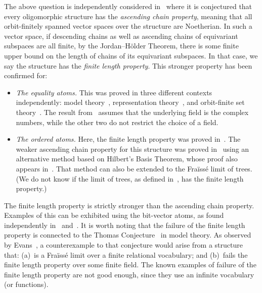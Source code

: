 The above question is independently considered in~\cite[p.~21]{BFKM24} where it is conjectured that every oligomorphic structure has the \emph{ascending chain property}, meaning that all orbit-finitely spanned vector spaces over the structure are Noetherian.
In such a vector space, if descending chains as well as ascending chains of equivariant subspaces are all finite, by the Jordan--Hölder Theorem, there is some finite upper bound on the length of chains of its equivariant subspaces.
In that case, we say the structure has the \emph{finite length property}.
This stronger property has been confirmed for:
\begin{itemize}
    \item \emph{The equality atoms.} 
    This was proved in three different contexts independently: model theory~\cite[Thm.~3.9]{EvansRashwan_02}, representation theory~\cite[Prop.~6.1.6]{SamSnowden_15}, and orbit-finite set theory~\cite[Cor.~4.9]{BFKM24}. 
    The result from~\cite{SamSnowden_15} assumes that the underlying field is the complex numbers, while the other two do not restrict the choice of a field. 
    \item \emph{The ordered atoms.} 
    Here, the finite length property was proved in~\cite[Thm.~4.8]{BFKM24}. 
    The weaker ascending chain property for this structure was proved in~\cite[Thm.~27]{GhoshLasota_24} using an alternative method based on Hilbert's Basis Theorem, 
    whose proof also appears in~\cite[Ex.~3.2(c)]{LaudoneSnowden_23}. 
    That method can also be extended to the Fraïssé limit of trees.
    (We do not know if the limit of trees, as defined in~\cite[Fact~2.16]{KaplanRzepeckiSiniora_21}, has the finite length property.)
\end{itemize}
The finite length property is strictly stronger than the ascending chain property. 
Examples of this can be exhibited using the bit-vector atoms, as found independently in~\cite[Thm.~2.7]{Gray97} and~\cite[Thm.~4.16]{BFKM24}. 
It is worth noting that the failure of the finite length property is connected to the Thomas Conjecture~\cite[p.~177]{thomas1991reducts} in model theory. 
As observed by Evans~\cite[Sld.~6]{Evans2025Permutation}, a counterexample to that conjecture would arise from a structure that: 
(a)~is a Fraïssé limit over a finite relational vocabulary; 
and (b)~fails the finite length property over some finite field. 
The known examples of failure of the finite length property are not good enough, since they use an infinite vocabulary (or functions).

